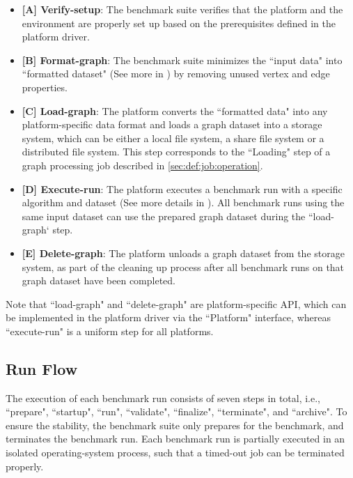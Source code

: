 \begin{itemize}
    \item \textbf{[A] Verify-setup}: The benchmark suite verifies that the platform and the environment are properly set up based on the prerequisites defined in the platform driver.
    
    \item \textbf{[B] Format-graph}: The benchmark suite minimizes the ``input data" into ``formatted dataset" (See more in ) by removing unused vertex and edge properties.
    
    \item \textbf{[C] Load-graph}: The platform converts the ``formatted data" into any platform-specific data format and loads a graph dataset into a storage system, which can be either a local file system, a share file system or a distributed file system. This step corresponds to the ``Loading" step of a graph processing job described in \ref{sec:def:job:operation}.
    
    \item \textbf{[D] Execute-run}: The platform executes a benchmark run with a specific algorithm and dataset (See more details in ). All benchmark runs using the same input dataset can use the prepared graph dataset during the ``load-graph` step. 
    
    \item \textbf{[E] Delete-graph}: The platform unloads a graph dataset from the storage system, as part of the cleaning up process after all benchmark runs on that graph dataset have been completed.
\end{itemize}

Note that ``load-graph" and ``delete-graph" are platform-specific API, which can be implemented in the platform driver via the ``Platform" interface, whereas  ``execute-run" is a uniform step for all platforms.

\subsection{Run Flow}
\label{sec:process:execution:run_flow}
The execution of each benchmark run consists of seven steps in total, i.e., ``prepare", ``startup", ``run", ``validate", ``finalize", ``terminate", and  ``archive". To ensure the stability, the benchmark suite only prepares for the benchmark, and terminates the benchmark run. Each benchmark run is partially executed in an isolated operating-system process, such that a timed-out job can be terminated properly.

